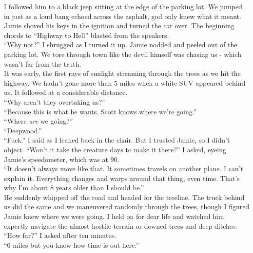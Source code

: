 \documentclass[a5paper]{scrartcl}
\begin{document}
I followed him to a black jeep sitting at the edge of the parking lot. We jumped in just as a loud bang echoed across the asphalt, god only knew what it meant. Jamie shoved his keys in the ignition and turned the car over. The beginning chords to \enquote{Highway to Hell} blasted from the speakers.\\


\enquote{Why not?} I shrugged as I turned it up. Jamie nodded and peeled out of the parking lot. We tore through town like the devil himself was chasing us - which wasn't far from the truth.\\


It was early, the first rays of sunlight streaming through the trees as we hit the highway. We hadn't gone more than 5 miles when a white SUV appeared behind us. It followed at a considerable distance.\\


\enquote{Why aren't they overtaking us?}\\


\enquote{Because this is what he wants. Scott knows where we're going.}\\


\enquote{Where \textit{are} we going?}\\


\enquote{Deepwood.}\\


\enquote{Fuck.} I said as I leaned back in the chair. But I trusted Jamie, so I didn't object.  \enquote{Won't it take the creature days to make it there?} I asked, eyeing Jamie's speedometer, which was at 90. \\


\enquote{It doesn't always move like that. It sometimes travels on another plane. I can't explain it. Everything changes and warps around that thing, even time. That's why I'm about 8 years older than I should be.}\\


He suddenly whipped off the road and headed for the treeline. The truck behind us did the same and we maneuvered randomly through the trees, though I figured Jamie knew where we were going. I held on for dear life and watched him expertly navigate the almost hostile terrain or downed trees and deep ditches. \\


\enquote{How far?} I asked after ten minutes.\\


\enquote{6 miles but you know how time is out here.} \\
\end{document}
